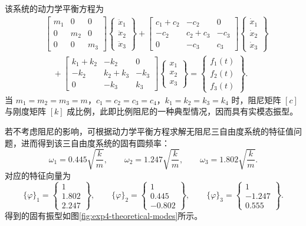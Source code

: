\documentclass[UTF8,a4paper,12pt]{ctexart}
\numberwithin{equation}{section}
\begin{document}
该系统的动力学平衡方程为
\begin{equation}
\begin{aligned}
&\begin{bmatrix}
 m_1&0&0\\0&m_2&0\\0&0&m_3
\end{bmatrix}
\begin{Bmatrix}\ddot{x}_1\\\ddot{x}_2\\\ddot{x}_3\end{Bmatrix}
+\begin{bmatrix}
 c_1+c_2&-c_2&0\\-c_2&c_2+c_3&-c_3\\0&-c_3&c_3
\end{bmatrix}
\begin{Bmatrix}\dot{x}_1\\\dot{x}_2\\\dot{x}_3\end{Bmatrix}\\
&\quad+\begin{bmatrix}
 k_1+k_2&-k_2&0\\-k_2&k_2+k_3&-k_3\\0&-k_3&k_3
\end{bmatrix}
\begin{Bmatrix}x_1\\x_2\\x_3\end{Bmatrix}
=\begin{Bmatrix}f_1(t)\\f_2(t)\\f_3(t)\end{Bmatrix}.
\end{aligned}
\end{equation}
当 $m_1=m_2=m_3=m$，$c_1=c_2=c_3=c_4$，$k_1=k_2=k_3=k_4$ 时，阻尼矩阵 $[c]$ 与刚度矩阵 $[k]$ 成比例，此即比例阻尼的一种典型情况，因而具有实模态振型。

若不考虑阻尼的影响，可根据动力学平衡方程求解无阻尼三自由度系统的特征值问题，进而得到该三自由度系统的固有圆频率：
\begin{equation}
  \omega_1=0.445\sqrt{\frac{k}{m}},\qquad
  \omega_2=1.247\sqrt{\frac{k}{m}},\qquad
  \omega_3=1.802\sqrt{\frac{k}{m}}.
\end{equation}
对应的特征向量为
\begin{equation}
  \{\varphi\}_1=\begin{Bmatrix}1\\1.802\\2.247\end{Bmatrix},\qquad
  \{\varphi\}_2=\begin{Bmatrix}1\\0.445\\-0.802\end{Bmatrix},\qquad
  \{\varphi\}_3=\begin{Bmatrix}1\\-1.247\\0.555\end{Bmatrix}.
\end{equation}
得到的固有振型如图\ref{fig:exp4-theoretical-modes}所示。
\end{document}
